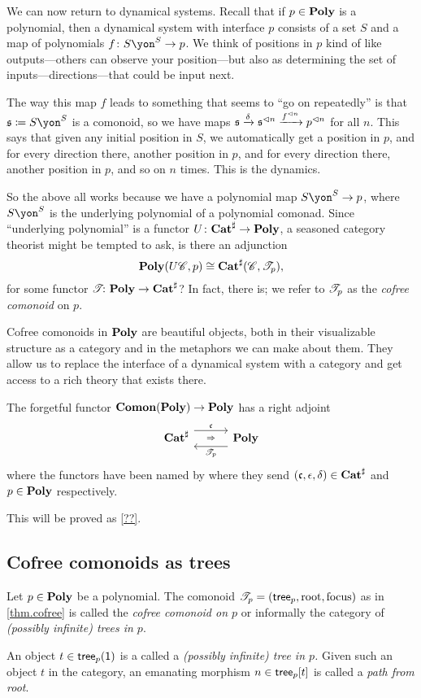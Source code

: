 \documentclass[DynamicalBook]{subfiles}
\begin{document}
We can now return to dynamical systems. Recall that if $p\in\textbf{Poly}$ is a polynomial, then a dynamical system with interface $p$ consists of a set $S$ and a map of polynomials $f\colon S\yon^S\to p$. We think of positions in $p$ kind of like outputs---others can observe your position---but also as determining the set of inputs---directions---that could be input next.

The way this map $f$ leads to something that seems to ``go on repeatedly'' is that $\ema{s}\coloneqq S\yon^S$ is a comonoid, so we have maps $\mathfrak{s}\xrightarrow{\delta}\mathfrak{s}^{\lhd n}\xrightarrow{f^{\lhd n}}p^{\lhd n}$ for all $n$. This says that given any initial position in $S$, we automatically get a position in $p$, and for every direction there, another position in $p$, and for every direction there, another position in $p$, and so on $n$ times. This is the dynamics.

So the above all works because we have a polynomial map $S\yon^S\to p$, where $S\yon^S$ is the underlying polynomial of a polynomial comonad. Since ``underlying polynomial'' is a functor $U\colon\textbf{Cat}^\sharp\to\textbf{Poly}$, a seasoned category theorist might be tempted to ask, is there an adjunction
\[
\textbf{Poly}(U\mathscr{C},p)\cong\textbf{Cat}^\sharp(\mathscr{C},\mathscr{T}_{p}),
\]
for some functor $\mathscr{T}_{}\colon\textbf{Poly}\to\textbf{Cat}^\sharp$? In fact, there is; we refer to $\mathscr{T}_{p}$ as the \emph{cofree comonoid} on $p$.

Cofree comonoids in $\textbf{Poly}$ are beautiful objects, both in their visualizable structure as a category and in the metaphors we can make about them. They allow us to replace the interface of a dynamical system with a category and get access to a rich theory that exists there.

\begin{theorem}\label{thm.cofree}
The forgetful functor $\textbf{Comon}(\textbf{Poly})\to\textbf{Poly}$ has a right adjoint
\[
  \adj{\smcat^\sharp}{\ema{c}}{\cofree{p}}{\poly}
\]
where the functors have been named by where they send $(\mathfrak{c},\epsilon,\delta)\in\textbf{Cat}^\sharp$ and $p\in\textbf{Poly}$ respectively.
\end{theorem}
This will be proved as \cref{??}.

\subsection{Cofree comonoids as trees}\label{subsec.cofree_tree}

\begin{definition}\label{def.cofree}
Let $p\in\textbf{Poly}$ be a polynomial. The comonoid $\mathscr{T}_{p}=(\mathsf{tree}_p,\mathrm{root},\mathrm{focus})$ as in \cref{thm.cofree} is called the \emph{cofree comonoid on $p$} or informally the category of \emph{(possibly infinite) trees in $p$}.

An object $t\in \mathsf{tree}_p(\textsf{1})$ is a called a \emph{(possibly infinite) tree in $p$.} Given such an object $t$ in the category, an emanating morphism $n\in\mathsf{tree}_p[t]$ is called a \emph{path from root}.
\end{definition}
\end{document}
